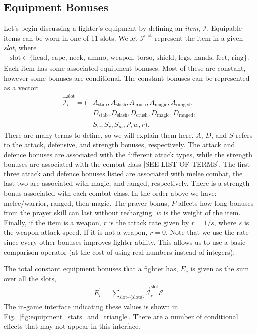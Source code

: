 	\subsection{Equipment Bonuses}\label{sec:equipment_bonuses}
		Let's begin discussing a fighter's equipment by defining an \textit{item}, $\mathcal{I}$. Equipable items can be worn in one of 11 slots. We let $\mathcal{I}^\text{slot}$ represent the item in a given \textit{slot}, where
		\begin{align}
			\text{slot} \in \{\text{head, cape, neck, ammo, weapon, torso, shield, legs, hands, feet, ring}\}.
		\end{align}
		Each item has some associated equipment bonuses. Most of these are constant, however some bonuses are conditional. The constant bonuses can be represented as a vector:
		\begin{align}
			\vec{\mathcal{I}}^{\text{slot}}_c = (
				&A_\text{stab}, A_\text{slash}, A_\text{crush}, A_\text{magic}, A_\text{ranged}, \\
				&D_\text{stab}, D_\text{slash}, D_\text{crush}, D_\text{magic}, D_\text{ranged}, \\
				&S_w, S_r, S_m, P, w, r).
		\end{align}
		There are many terms to define, so we will explain them here. $A$, $D$, and $S$ refers to the attack, defensive, and strength bonuses, respectively. The attack and defence bonuses are associated with the different attack types, while the strength bonuses are associated with the combat class [SEE LIST OF TERMS]. The first three attack and defence bonuses listed are associated with melee combat, the last two are associated with magic, and ranged, respectively. There is a strength bonus associated with each combat class. In the order above we have: melee/warrior, ranged, then magic. The prayer bonus, $P$ affects how long bonuses from the prayer skill can last without recharging. $w$ is the weight of the item. Finally, if the item is a weapon, $r$ is the attack rate given by $r=1/s$, where $s$ is the weapon attack speed. If it is not a weapon, $r=0$. Note that we use the rate since every other bonuses improves fighter ability. This allows us to use a basic comparison operator (at the cost of using real numbers instead of integers).

		The total constant equipment bonuses that a fighter has, $E_c$ is given as the sum over all the slots,
		\begin{align}
			\vec{E}_c = \sum_\text{slot$\in$\{slots\}} \vec{\mathcal{I}}^\text{slot}_c \mathcal{E}.
		\end{align}
		The in-game interface indicating these values is shown in Fig.~\ref{fig:equipment_stats_and_triangle}. There are a number of conditional effects that may not appear in this interface.

